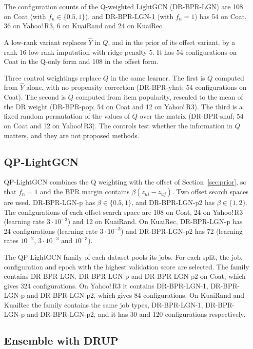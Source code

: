 The configuration counts of the Q-weighted LightGCN (DR-BPR-LGN) are 108 on Coat (with $f_n\in\{0.5,1\}$), and
DR-BPR-LGN-1 (with $f_n=1$) has 54 on Coat, 36 on Yahoo!\,R3, 6 on KuaiRand and 24 on KuaiRec.

A low-rank variant replaces $\hat Y$ in $Q$, and in the prior of its offset variant, by a rank-16 low-rank
imputation with ridge penalty 5. It has 54 configurations on Coat in the Q-only form and 108 in the offset form.

Three control weightings replace $Q$ in the same learner. The first is $Q$ computed from $\hat Y$ alone, with no
propensity correction (DR-BPR-yhat; 54 configurations on Coat). The second is $Q$ computed from item popularity,
rescaled to the mean of the DR weight (DR-BPR-pop; 54 on Coat and 12 on Yahoo!\,R3). The third is a fixed random
permutation of the values of $Q$ over the matrix (DR-BPR-shuf; 54 on Coat and 12 on Yahoo!\,R3). The controls
test whether the information in $Q$ matters, and they are not proposed methods.

\subsection{QP-LightGCN}\label{sec:qp}

QP-LightGCN combines the Q weighting with the offset of Section~\ref{sec:prior}, so that $f_n=1$ and the BPR
margin contains $\beta(z_{ui}-z_{uj})$. Two offset search spaces are used. DR-BPR-LGN-p has $\beta\in\{0.5,1\}$, and
DR-BPR-LGN-p2 has $\beta\in\{1,2\}$. The configurations of each offset search space are 108 on Coat, 24 on Yahoo!\,R3 (learning rate $3\cdot10^{-3}$) and 12
on KuaiRand. On KuaiRec, DR-BPR-LGN-p has 24 configurations (learning rate $3\cdot10^{-3}$) and DR-BPR-LGN-p2 has 72
(learning rates $10^{-2}$, $3\cdot10^{-3}$ and $10^{-3}$).

The QP-LightGCN family of each dataset pools its jobs. For each split, the job, configuration and epoch with the
highest validation score are selected. The family contains DR-BPR-LGN, DR-BPR-LGN-p and DR-BPR-LGN-p2 on Coat,
which gives 324 configurations. On Yahoo!\,R3 it contains DR-BPR-LGN-1, DR-BPR-LGN-p and DR-BPR-LGN-p2, which gives
84 configurations. On KuaiRand and KuaiRec the family contains the same job types, DR-BPR-LGN-1, DR-BPR-LGN-p and DR-BPR-LGN-p2,
and it has 30 and 120 configurations respectively.

\subsection{Ensemble with DRUP}\label{sec:ensemble}

